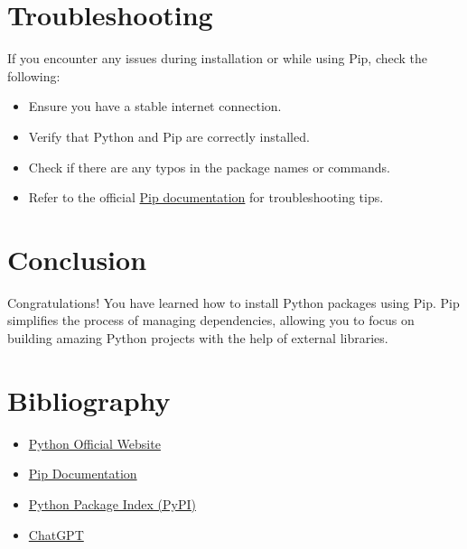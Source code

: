 \documentclass[a4paper, 12pt]{report}
\begin{document}
    
    \section{Troubleshooting}
        If you encounter any issues during installation or while using Pip, check the following:
        
        \begin{itemize}
            \item Ensure you have a stable internet connection.
            \item Verify that Python and Pip are correctly installed.
            \item Check if there are any typos in the package names or commands.
            \item Refer to the official \href{https://pip.pypa.io/en/stable/}{Pip documentation} for troubleshooting tips.
        \end{itemize}
    
    \section{Conclusion}
        Congratulations! You have learned how to install Python packages using Pip. Pip simplifies the process of managing dependencies, allowing you to focus on building amazing Python projects with the help of external libraries.

    \newpage
    
    \section{Bibliography}
        \begin{itemize}
            \item \href{https://www.python.org}{Python Official Website}
            \item \href{https://pip.pypa.io/en/stable/}{Pip Documentation}
            \item \href{https://pypi.org/}{Python Package Index (PyPI)}
            \item \href{https://chat.openai.com/}{ChatGPT}
        \end{itemize}
\end{document}
